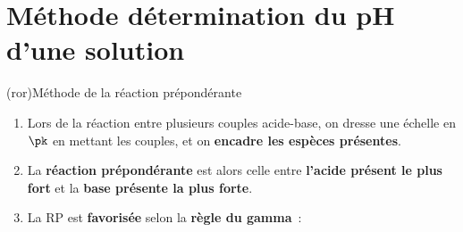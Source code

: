 \documentclass[../../main/main.tex]{subfiles}
\begin{document}
\section{Méthode détermination du pH d'une solution}
\begin{tcb*}(ror){Méthode de la réaction prépondérante}
	\begin{enumerate}[label=\sqenumi]
		\item Lors de la réaction entre plusieurs couples acide-base,
		      on dresse une échelle en $\pk$ en mettant les couples, et on
		      \textbf{encadre les espèces présentes}.
		\item La \textbf{réaction prépondérante} est alors celle entre
		      \textbf{l'acide présent le plus fort} et la \textbf{base présente la plus
			      forte}.
		\item La RP est \textbf{favorisée} selon la \textbf{règle du gamma}~:
		      \smallbreak
		      \begin{isd}
			      \begin{center}
\end{center}
\end{isd}
\end{enumerate}
\end{tcb*}
\end{document}
